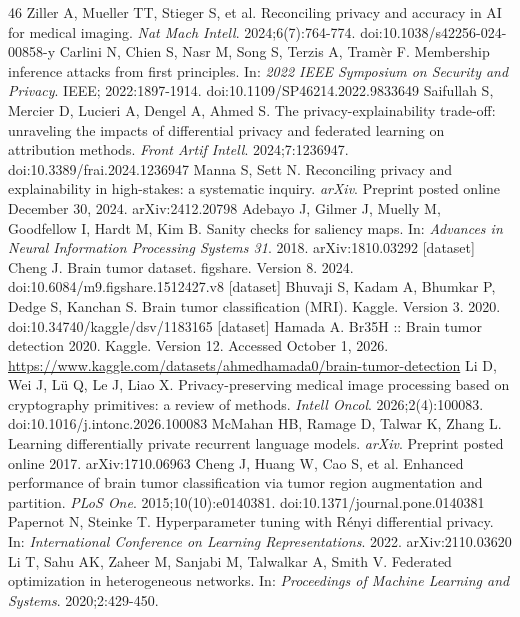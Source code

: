 \begin{thebibliography}{46}
 Ziller A, Mueller TT, Stieger S, et al. Reconciling privacy and accuracy in AI for medical imaging. \textit{Nat Mach Intell}. 2024;6(7):764-774. doi:10.1038/s42256-024-00858-y
 Carlini N, Chien S, Nasr M, Song S, Terzis A, Tram\`er F. Membership inference attacks from first principles. In: \textit{2022 IEEE Symposium on Security and Privacy}. IEEE; 2022:1897-1914. doi:10.1109/SP46214.2022.9833649
 Saifullah S, Mercier D, Lucieri A, Dengel A, Ahmed S. The privacy-explainability trade-off: unraveling the impacts of differential privacy and federated learning on attribution methods. \textit{Front Artif Intell}. 2024;7:1236947. doi:10.3389/frai.2024.1236947
 Manna S, Sett N. Reconciling privacy and explainability in high-stakes: a systematic inquiry. \textit{arXiv}. Preprint posted online December 30, 2024. arXiv:2412.20798
 Adebayo J, Gilmer J, Muelly M, Goodfellow I, Hardt M, Kim B. Sanity checks for saliency maps. In: \textit{Advances in Neural Information Processing Systems 31}. 2018. arXiv:1810.03292
 [dataset] Cheng J. Brain tumor dataset. figshare. Version 8. 2024. doi:10.6084/m9.figshare.1512427.v8
 [dataset] Bhuvaji S, Kadam A, Bhumkar P, Dedge S, Kanchan S. Brain tumor classification (MRI). Kaggle. Version 3. 2020. doi:10.34740/kaggle/dsv/1183165
 [dataset] Hamada A. Br35H :: Brain tumor detection 2020. Kaggle. Version 12. Accessed October 1, 2026. \url{https://www.kaggle.com/datasets/ahmedhamada0/brain-tumor-detection}
 Li D, Wei J, L\"{u} Q, Le J, Liao X. Privacy-preserving medical image processing based on cryptography primitives: a review of methods. \textit{Intell Oncol}. 2026;2(4):100083. doi:10.1016/j.intonc.2026.100083
 McMahan HB, Ramage D, Talwar K, Zhang L. Learning differentially private recurrent language models. \textit{arXiv}. Preprint posted online 2017. arXiv:1710.06963
 Cheng J, Huang W, Cao S, et al. Enhanced performance of brain tumor classification via tumor region augmentation and partition. \textit{PLoS One}. 2015;10(10):e0140381. doi:10.1371/journal.pone.0140381
 Papernot N, Steinke T. Hyperparameter tuning with R\'enyi differential privacy. In: \textit{International Conference on Learning Representations}. 2022. arXiv:2110.03620
 Li T, Sahu AK, Zaheer M, Sanjabi M, Talwalkar A, Smith V. Federated optimization in heterogeneous networks. In: \textit{Proceedings of Machine Learning and Systems}. 2020;2:429-450.

\end{thebibliography}
